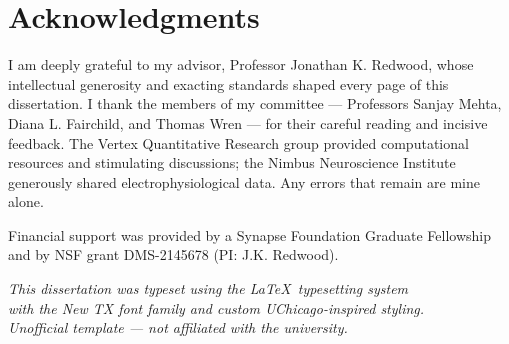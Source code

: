 \chapter*{Acknowledgments}

I am deeply grateful to my advisor, Professor Jonathan K. Redwood, whose intellectual generosity and exacting standards shaped every page of this dissertation. I thank the members of my committee --- Professors Sanjay Mehta, Diana L. Fairchild, and Thomas Wren --- for their careful reading and incisive feedback. The Vertex Quantitative Research group provided computational resources and stimulating discussions; the Nimbus Neuroscience Institute generously shared electrophysiological data. Any errors that remain are mine alone.

Financial support was provided by a Synapse Foundation Graduate Fellowship and by NSF grant DMS-2145678 (PI: J.K. Redwood).

\vspace{12pt}

\begin{center}
  \begin{minipage}{0.55\textwidth}
    \centering
    \begin{tcolorbox}[colback=ChicagoMaroon!5,colframe=ChicagoMaroon!30,arc=6pt,boxrule=0.4pt]
      \small\itshape\color{ChicagoGray}
      \faBookmark\;\; This dissertation was typeset using the \LaTeX\ typesetting system\\
      with the New TX font family and custom UChicago-inspired styling.\\
      Unofficial template --- not affiliated with the university.
    \end{tcolorbox}
  \end{minipage}
\end{center}

